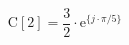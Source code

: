 \begin{center}
\[
\textrm{C}[2] = \frac{3}{2} \cdot \textrm{e}^{\{ j \cdot \pi/5 \}}
\]
\end{center}
